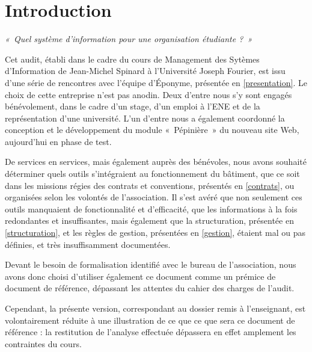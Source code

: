 \section*{Introduction}

\textit{«~Quel système d'information pour une organisation étudiante ?~»}

Cet audit, établi dans le cadre du cours de Management des Sytèmes
d'Information de Jean-Michel Spinard à l'Université Joseph Fourier,
est issu d'une série
de rencontres avec l'équipe d'Éponyme, présentée en \ref{presentation}.
Le choix de cette entreprise n'est pas anodin. Deux d'entre nous s'y sont
engagés bénévolement, dans le cadre d'un stage, d'un emploi à l'ENE et de la
représentation d'une université. L'un d'entre nous a également coordonné la
conception et le développement du module «~Pépinière~» du nouveau site Web,
aujourd'hui en phase de test.

De services en services, mais également auprès des bénévoles, nous
avons souhaité déterminer quels outils s'intégraient au fonctionnement du
bâtiment, que ce soit dans les missions régies des contrats et conventions,
présentés en \ref{contrats}, ou organisées selon les volontés de l'association.
Il s'est avéré que non seulement ces outils manquaient de fonctionnalité et
d'efficacité, que les informations à la fois redondantes et insuffisantes,
mais également que la structuration, présentée en \ref{structuration}, et les
règles de gestion, présentées en \ref{gestion}, étaient mal ou pas définies,
et très insuffisamment documentées.

Devant le besoin de formalisation identifié avec le bureau de l'association,
nous avons donc choisi d'utiliser également ce document comme un prémice
de document de référence, dépassant les attentes du cahier des charges de
l'audit.

Cependant, la présente version, correspondant au dossier remis à l'enseignant,
est volontairement réduite à une illustration de ce que ce que sera
ce document de référence : la restitution de l'analyse effectuée dépassera
en effet amplement les contraintes du cours.